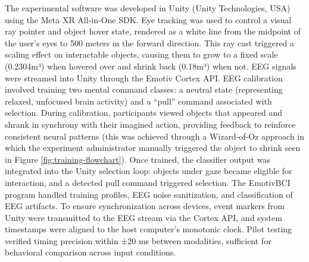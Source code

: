 \documentclass[utf8]{FrontiersinHarvard} %
\begin{document}
The experimental software was developed in Unity (Unity Technologies, USA) using the Meta XR All-in-One SDK. Eye tracking was used to control a visual ray pointer and object hover state, rendered as a white line from the midpoint of the user's eyes to 500 meters in the forward direction. This ray cast triggered a scaling effect on interactable objects, causing them to grow to a fixed scale (0.2304m³) when hovered over and shrink back (0.18m³) when not. EEG signals were streamed into Unity through the Emotiv Cortex API. EEG calibration involved training two mental command classes: a neutral state (representing relaxed, unfocused brain activity) and a “pull” command associated with selection. During calibration, participants viewed objects that appeared and shrank in synchrony with their imagined action, providing feedback to reinforce consistent neural patterns (this was achieved through a Wizard-of-Oz approach in which the experiment administrator manually triggered the object to shrink seen in Figure \ref{fig:training-flowchart}). Once trained, the classifier output was integrated into the Unity selection loop: objects under gaze became eligible for interaction, and a detected pull command triggered selection. The EmotivBCI program handled training profiles, EEG noise sanitization, and classification of EEG artifacts.
To ensure synchronization across devices, event markers from Unity were transmitted to the EEG stream via the Cortex API, and system timestamps were aligned to the host computer's monotonic clock. Pilot testing verified timing precision within ±20 ms between modalities, sufficient for behavioral comparison across input conditions.
\end{document}

